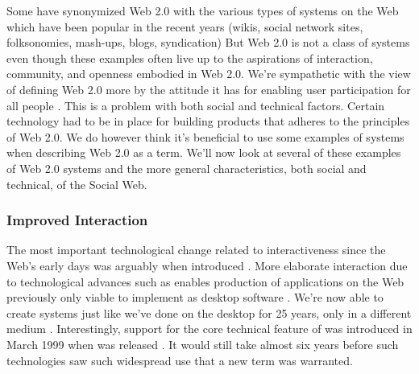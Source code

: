 Some have synonymized Web 2.0 with the various types of systems on the
Web which have been popular in the recent years
(wikis, social network sites, folksonomies, mash-ups, blogs, syndication)
But Web 2.0 is not a class of systems \citep[]{millard06} even though
these examples often live up to the aspirations of interaction, community,
and openness embodied in Web 2.0. We're sympathetic with the view of defining
Web 2.0 more by the attitude it has for enabling user participation for all
people \citep[]{lin07}. This is a problem with both social and
technical factors. Certain technology had to be in place for building
products that adheres to the principles of Web 2.0. We do however think it's
beneficial to use some examples of systems when describing Web 2.0 as a term.
We'll now look at several of these examples of Web 2.0 systems and
the more general characteristics, both social and technical,
of the Social Web.

\subsubsection{Improved Interaction}
The most important
technological change related to interactiveness since the Web's early days was
arguably when \citet{garrett05} introduced %
.
More elaborate interaction due to technological advances such as 
enables production of applications on the Web previously only viable to
implement as desktop software .
We're now able to create systems just like we've done on the desktop for 25
years, only in a different medium \citep[]{arnowitz07}.
Interestingly, support for the core technical feature of  was
introduced in March 1999 when 
was released \citep{microsoft99}. It would still take almost six years before
such technologies saw such widespread use that a new term was warranted.

